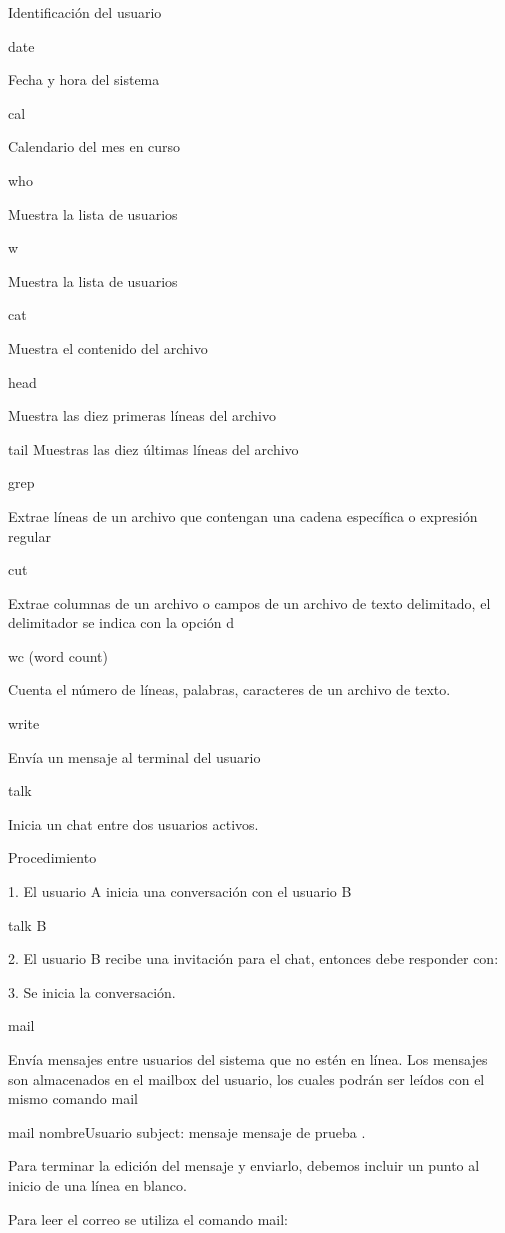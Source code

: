 \documentclass{memoir}
\begin{document}
Identificación del usuario

date

Fecha y hora del sistema

cal

Calendario del mes en curso

who

Muestra la lista de usuarios

w

Muestra la lista de usuarios

cat

Muestra el contenido del archivo

head

Muestra las diez primeras líneas del archivo

tail Muestras las diez últimas líneas del archivo

grep

Extrae líneas de un archivo que contengan una cadena específica o expresión regular

cut

Extrae columnas de un archivo o campos de un archivo de texto delimitado, el delimitador se indica con la opción d

wc (word count)

Cuenta el número de líneas, palabras, caracteres de un archivo de texto.

write

Envía un mensaje al terminal del usuario

talk

Inicia un chat entre dos usuarios activos.

Procedimiento

1. El usuario A inicia una conversación con el usuario B

talk B

2. El usuario B recibe una invitación para el chat, entonces debe responder con:

3. Se inicia la conversación.

mail

Envía mensajes entre usuarios del sistema que no estén en línea. Los mensajes son almacenados en el mailbox del usuario, los cuales podrán ser leídos con el mismo comando mail

mail nombreUsuario
subject: mensaje
mensaje de prueba
.

Para terminar la edición del mensaje y enviarlo, debemos incluir un punto al inicio de una línea en blanco.

Para leer el correo se utiliza el comando mail:
\end{document}
